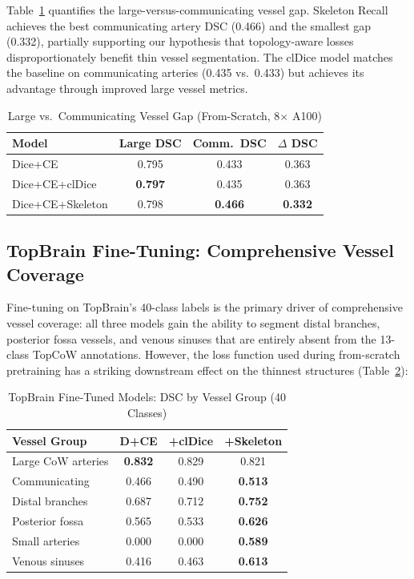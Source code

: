 \documentclass[conference]{IEEEtran}
\begin{document}
Table~\ref{tab:gap} quantifies the large-versus-communicating vessel gap. Skeleton Recall achieves the best communicating artery DSC (0.466) and the smallest gap (0.332), partially supporting our hypothesis that topology-aware losses disproportionately benefit thin vessel segmentation. The clDice model matches the baseline on communicating arteries (0.435 vs.\ 0.433) but achieves its advantage through improved large vessel metrics.

\begin{table}[t]
\centering
\caption{Large vs.\ Communicating Vessel Gap (From-Scratch, 8$\times$ A100)}
\label{tab:gap}
\begin{tabular}{lccc}
\toprule
\textbf{Model} & \textbf{Large DSC} & \textbf{Comm.\ DSC} & \textbf{$\Delta$ DSC} \\
\midrule
Dice+CE          & 0.795 & 0.433 & 0.363 \\
Dice+CE+clDice   & \textbf{0.797} & 0.435 & 0.363 \\
Dice+CE+Skeleton & 0.798 & \textbf{0.466} & \textbf{0.332} \\
\bottomrule
\end{tabular}
\end{table}

\subsection{TopBrain Fine-Tuning: Comprehensive Vessel Coverage}

Fine-tuning on TopBrain's 40-class labels is the primary driver of comprehensive vessel coverage: all three models gain the ability to segment distal branches, posterior fossa vessels, and venous sinuses that are entirely absent from the 13-class TopCoW annotations. However, the loss function used during from-scratch pretraining has a striking downstream effect on the thinnest structures (Table~\ref{tab:topbrain}):

\begin{table}[t]
\centering
\caption{TopBrain Fine-Tuned Models: DSC by Vessel Group (40 Classes)}
\label{tab:topbrain}
\begin{tabular}{lccc}
\toprule
\textbf{Vessel Group} & \textbf{D+CE} & \textbf{+clDice} & \textbf{+Skeleton} \\
\midrule
Large CoW arteries    & \textbf{0.832} & 0.829 & 0.821 \\
Communicating         & 0.466 & 0.490 & \textbf{0.513} \\
Distal branches       & 0.687 & 0.712 & \textbf{0.752} \\
Posterior fossa       & 0.565 & 0.533 & \textbf{0.626} \\
Small arteries        & 0.000 & 0.000 & \textbf{0.589} \\
Venous sinuses        & 0.416 & 0.463 & \textbf{0.613} \\
\bottomrule
\end{tabular}
\end{table}
\end{document}
